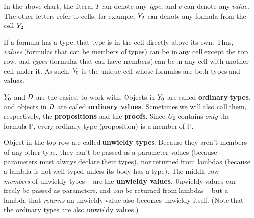 \documentclass{article}
\newcommand{\Prop}{\mathbb{P}}
\begin{document}
  \vspace{0.5cm}

  In the above chart, the literal $T$ can denote any \emph{type}, and $v$ can denote any \emph{value}. The other letters refer to cells; for example, $Y_2$ can denote any formula from the cell $Y_2$.
  

  If a formula has a type, that type is in the cell directly above its own. Thus, \emph{values} (formulas that can be members of types) can be in any cell except the top row, and \emph{types} (formulas that can have members) can be in any cell with another cell under it. As such, $Y_0$ is the unique cell whose formulas are both types and values.
  
  $Y_0$ and $D$ are the easiest to work with. Objects in $Y_0$ are called \textbf{ordinary types}, and objects in $D$ are called \textbf{ordinary values}. Sometimes we will also call them, respectively, the \textbf{propositions} and the \textbf{proofs}. Since $U_0$ contains \emph{only} the formula $\Prop$, every ordinary type (proposition) is a member of $\Prop$.
  
  Object in the top row are called \textbf{unwieldy types}. Because they aren't members of any other type, they can't be passed as a parameter values (because parameters must always declare their types), nor returned from lambdas (because a lambda is not well-typed unless its body has a type). The middle row – \emph{members} of unwieldy types – are the \textbf{unwieldy values}. Unwieldy values can freely be passed as parameters, and \emph{can} be returned from lambdas – but a lambda that \emph{returns} an unwieldy value also becomes unwieldy itself. (Note that the ordinary types are also unwieldy values.)
  
  
  
  \printbibliography
\end{document}

